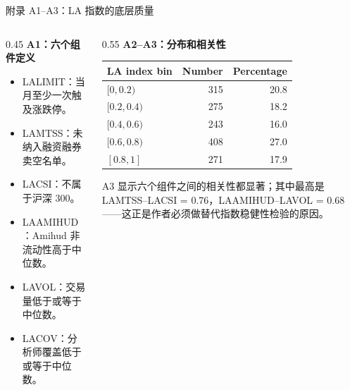 \documentclass[aspectratio=169,10pt]{beamer}
\begin{document}
\begin{frame}{附录 A1--A3：LA 指数的底层质量}
	\begin{columns}[t]
		\begin{column}{0.45\textwidth}
			\textbf{A1：六个组件定义}
			\scriptsize
			\begin{itemize}
				\item LALIMIT：当月至少一次触及涨跌停。
				\item LAMTSS：未纳入融资融券卖空名单。
				\item LACSI：不属于沪深 300。
				\item LAAMIHUD：Amihud 非流动性高于中位数。
				\item LAVOL：交易量低于或等于中位数。
				\item LACOV：分析师覆盖低于或等于中位数。
			\end{itemize}
		\end{column}
		\begin{column}{0.55\textwidth}
			\textbf{A2--A3：分布和相关性}
			\scriptsize
			\begin{tabular}{lrr}
				\toprule
				LA index bin & Number & Percentage\\
				\midrule
				$[0,0.2)$ & 315 & 20.8\\
				$[0.2,0.4)$ & 275 & 18.2\\
				$[0.4,0.6)$ & 243 & 16.0\\
				$[0.6,0.8)$ & 408 & 27.0\\
				$[0.8,1]$ & 271 & 17.9\\
				\bottomrule
			\end{tabular}
			\par\vspace{4pt}
			\scriptsize A3 显示六个组件之间的相关性都显著；其中最高是 LAMTSS--LACSI = 0.76，LAAMIHUD--LAVOL = 0.68——这正是作者必须做替代指数稳健性检验的原因。
		\end{column}
	\end{columns}
\end{frame}
\end{document}
